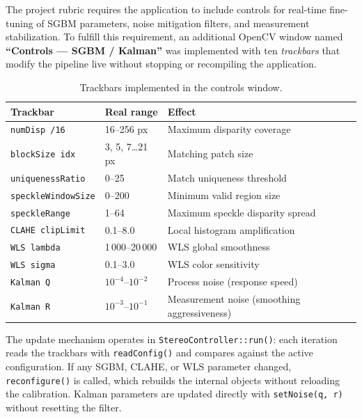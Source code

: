 \documentclass[12pt, a4paper]{article}
\begin{document}
The project rubric requires the application to include controls for real-time
fine-tuning of SGBM parameters, noise mitigation filters, and measurement
stabilization. To fulfill this requirement, an additional OpenCV window named
\textbf{``Controls --- SGBM / Kalman''} was implemented with ten \emph{trackbars}
that modify the pipeline live without stopping or recompiling the application.

\begin{table}[htbp]
\centering
\caption{Trackbars implemented in the controls window.}
\label{tab:trackbars}
\small
\begin{tabular}{p{3.6cm} p{2.6cm} p{6.6cm}}
\toprule
\textbf{Trackbar} & \textbf{Real range} & \textbf{Effect} \\
\midrule
\texttt{numDisp /16}        & 16--256 px            & Maximum disparity coverage \\
\texttt{blockSize idx}      & 3, 5, 7\ldots{}21 px  & Matching patch size \\
\texttt{uniquenessRatio}    & 0--25                 & Match uniqueness threshold \\
\texttt{speckleWindowSize}  & 0--200                & Minimum valid region size \\
\texttt{speckleRange}       & 1--64                 & Maximum speckle disparity spread \\
\texttt{CLAHE clipLimit}    & 0.1--8.0              & Local histogram amplification \\
\texttt{WLS lambda}         & 1\,000--20\,000       & WLS global smoothness \\
\texttt{WLS sigma}          & 0.1--3.0              & WLS color sensitivity \\
\texttt{Kalman Q}           & $10^{-4}$--$10^{-2}$ & Process noise (response speed) \\
\texttt{Kalman R}           & $10^{-3}$--$10^{-1}$ & Measurement noise (smoothing aggressiveness) \\
\bottomrule
\end{tabular}
\end{table}

The update mechanism operates in \texttt{StereoController::run()}: each iteration
reads the trackbars with \texttt{readConfig()} and compares against the active
configuration. If any SGBM, CLAHE, or WLS parameter changed, \texttt{reconfigure()}
is called, which rebuilds the internal objects without reloading the calibration.
Kalman parameters are updated directly with \texttt{setNoise(q,~r)} without
resetting the filter.
\end{document}

